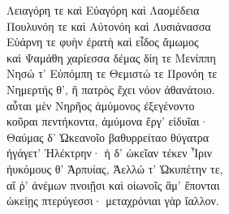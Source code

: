 \begin{pages}
\begin{Leftside}
Λειαγόρη τε καὶ Εὐαγόρη καὶ Λαομέδεια \\
Πουλυνόη τε καὶ Αὐτονόη καὶ Λυσιάνασσα\\
Εὐάρνη τε φυὴν ἐρατὴ καὶ εἶδος ἄμωμος\\
καὶ Ψαμάθη χαρίεσσα δέμας δίη τε Μενίππη \\
Νησώ τ' Εὐπόμπη τε Θεμιστώ τε Προνόη τε\\
Νημερτής θ', ἣ πατρὸς ἔχει νόον ἀθανάτοιο.\\
αὗται μὲν Νηρῆος ἀμύμονος ἐξεγένοντο\\
κοῦραι πεντήκοντα, ἀμύμονα ἔργ' εἰδυῖαι· \\

\quad{}Θαύμας δ' Ὠκεανοῖο βαθυρρείταο θύγατρα \\
ἠγάγετ' Ἠλέκτρην· ἡ δ' ὠκεῖαν τέκεν Ἶριν \\
ἠυκόμους θ' Ἁρπυίας, Ἀελλώ τ' Ὠκυπέτην τε, \\
αἵ ῥ' ἀνέμων πνοιῇσι καὶ οἰωνοῖς ἅμ' ἕπονται\\
ὠκείῃς πτερύγεσσι· μεταχρόνιαι γὰρ ἴαλλον. \\


\end{Leftside}
\end{pages}
